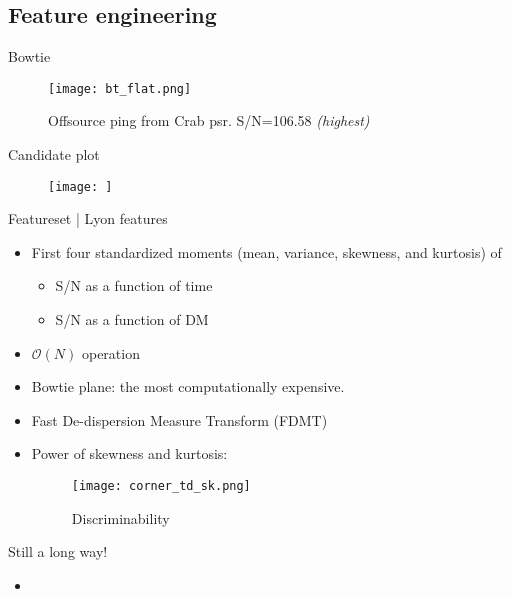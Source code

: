 \subsection{Feature engineering}
\begin{frame}{Bowtie}
	\begin{figure}
	\texttt{[image: bt\_flat.png]}
	\label{fig:bt_flat}
	\caption{Offsource ping from Crab psr. S/N=106.58 \emph{(highest)}}
	\end{figure}
\end{frame}

\begin{frame}{Candidate plot}
	\begin{figure}
	\texttt{[image: ]}
	\label{fig:candplot}
	\end{figure}
\end{frame}

\begin{frame}[allowframebreaks]{Featureset | Lyon features~\cite{lyon}}
\begin{itemize}
	\item First four standardized moments (mean, variance, skewness, and kurtosis) of \begin{itemize}
			\item S/N as a function of time
			\item S/N as a function of DM
		\end{itemize}
	\item $\mathcal{O}(N)$ operation
	\item Bowtie plane: the most computationally expensive.
	\item Fast De-dispersion Measure Transform (FDMT) \hfill \cite{fdmt}
	\item Power of skewness and kurtosis:
		\begin{figure}
			\texttt{[image: corner\_td\_sk.png]}
			\label{fig:corner}
			\caption{Discriminability}
		\end{figure}
\end{itemize}
\end{frame}

\begin{frame}{Still a long way!}
\begin{itemize}
	\item 
\end{itemize}
\end{frame}
